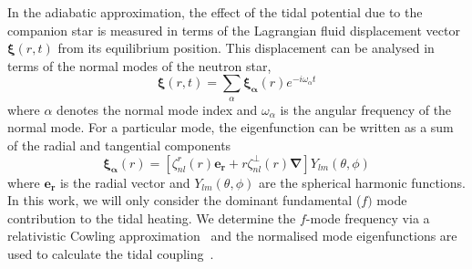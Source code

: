 \documentclass[%
 reprint,
 amsmath,amssymb,
 aps,
]{revtex4-2}
\begin{document}
In the adiabatic approximation, the effect of the tidal potential due to the companion star is measured in terms of the Lagrangian fluid displacement vector $\bm{\xi}(r,t)$ from its equilibrium position. This displacement can be analysed in terms of the normal modes of the neutron star, 
\begin{equation}\label{eq:normal}
    \bm{\xi} (r,t) = \sum_{\alpha}\bm{\xi_{\alpha}}(r) e^{-i\omega_{\alpha}t}
\end{equation}
where $\alpha$ denotes the normal mode index and $\omega_{\alpha}$ is the angular frequency of the normal mode. For a particular mode, the eigenfunction can be written as a sum of the radial and tangential components 
\begin{equation}\label{eq:eigenvector}
    \bm{\xi_{\alpha}}(r) = \left[\zeta^r_{nl}(r)\bm{e_r} + r\zeta^{\perp}_{nl}(r)\bm{\nabla}\right]Y_{lm}(\theta,\phi)
\end{equation}
where $\bm{e_r}$ is the radial vector and $Y_{lm}(\theta,\phi)$ are the spherical harmonic functions. In this work, we will only consider the dominant fundamental ($f)$ mode contribution to the tidal heating. We determine the $f$-mode frequency via a relativistic Cowling approximation~\cite{Pradhan_2021} and the normalised mode eigenfunctions are used to calculate the tidal coupling~\cite{Andersson_2018}. \\
\end{document}
